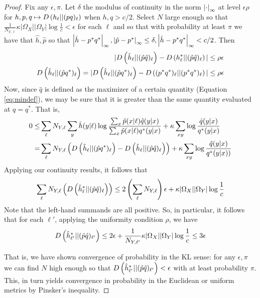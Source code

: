 \begin{proof}
Fix any $\epsilon,\pi$.  Let $\delta$ the modulus of continuity in the norm $\left|\cdot\right|_\infty$ at level $\epsilon\rho$ for $h,p,q \mapsto D\left(h_\ell||(pq)_\ell\right)$ when $h,q>c/2$.  Select $N$ large enough so that $\frac{1}{N_{Y,\ell}} \kappa |\Omega_X||\Omega_Y| \log \frac{1}{c} < \epsilon$ for each $\ell$ and so that with probability at least $\pi$ we have that $\hat h,\hat p$ so that $\left|\hat h-p^*q^*\right|_\infty,\left|\hat p-p^*\right|_\infty\leq \delta,\left|\hat h - p^*q^*\right|_\infty<c/2$. Then 
%
\begin{align*}
|D\left(\hat h_\ell||(\hat p \hat q)_\ell\right) - D\left(h^*_\ell||(\hat p \hat q)_\ell\right)| \leq \rho \epsilon \\
D\left(\hat h_\ell||(\hat p q^*)_\ell\right) = |D\left(\hat h_\ell||(\hat p q^*)_\ell\right) - D\left((p^*q^*)_\ell||(p^* q^*)_\ell\right)| \leq \rho\epsilon 
\end{align*}
%
Now, since $\hat q$ is defined as the maximizer of a certain quantity (Equation \ref{eq:mindef}), we may be sure that it is greater than the same quantity evaluated at $q=q^*$.  That is,
%
\begin{align*}
0 \leq& \sum_\ell N_{Y,\ell}\sum_{y}\hat h(y|\ell)\log\frac{\sum_{x}\hat p(x|\ell)\hat q(y|x)}{\sum_{x}\hat p(x|\ell)q^*(y|x)} + \kappa \sum_{xy} \log \frac{\hat q(y|x)}{q^*(y|x)}\\
 =& \sum_\ell N_{Y,\ell}\left(D\left(\hat h_\ell||(\hat pq^*)_\ell\right) - D\left(\hat h_\ell||(\hat p\hat q)_\ell\right)\right) + \kappa \sum_{xy} \log \frac{\hat q(y|x)}{q^*(y|x))}
\end{align*}
%
Applying our continuity results, it follows that
%
\begin{gather*}
 \sum_\ell N_{Y,\ell}\left(D\left(\hat h^*_\ell||(\hat p\hat q)_\ell\right)\right)  \leq 2\left(\sum_\ell N_{Y,\ell}\right)\epsilon  + \kappa |\Omega_X||\Omega_Y| \log \frac{1}{c} 
\end{gather*}
%
Note that the left-hand summands are all positive.  So, in particular, it follows that for each $\ell'$, applying the uniformity condition $\rho$, we have
%
\begin{gather*}
D\left(\hat h^*_{\ell'}||(\hat p\hat q)_{\ell'}\right)  \leq 2\epsilon  + \frac{1}{N_{Y,\ell'}} \kappa |\Omega_X||\Omega_Y| \log \frac{1}{c} \leq 3\epsilon
\end{gather*}

That is, we have shown convergence of probability in the KL sense: for any $\epsilon,\pi$ we can find $N$ high enough so that $D\left(\hat h^*_{\ell'}||(\hat p\hat q)_{\ell'}\right)<\epsilon$ with at least probability $\pi$.  This, in turn yields convergence in probability in the Euclidean or uniform metrics by Pinsker's inequality. 
\end{proof}








































